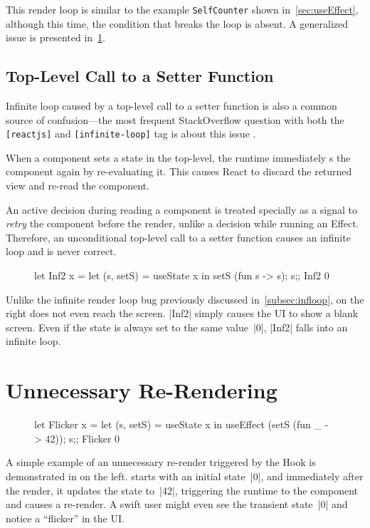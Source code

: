 This render loop is similar to the example \verb+SelfCounter+ shown in~\cref{sec:useEffect}, although this time, the condition that breaks the loop is absent.
A generalized issue is presented in~\cref{sec:unnec}.


\subsection{Top-Level Call to a Setter Function}\label{subsec:topset}
Infinite loop caused by a top-level call to a setter function is also a common source of confusion---the most frequent StackOverflow question with both the \texttt{[reactjs]} and \texttt{[infinite-loop]} tag is about this issue \citep{Teh19Updating}.

When a component sets a state in the top-level, the runtime immediately s the component again by re-evaluating it.
This causes React to discard the returned view and re-read the component.%

An active  decision during reading a component is treated specially as a signal to \emph{retry} the component before the render, unlike a  decision while running an Effect.
Therefore, an unconditional top-level call to a setter function causes an infinite loop and is never correct.

\begin{figure}
  \vspace{-0.9\intextsep}
  \begin{reactcode}
let Inf2 x =
  let (s, setS) = useState x in
  setS (fun s -> s);
  s;;
Inf2 0
  \end{reactcode}
\end{figure}
Unlike the infinite render loop bug previously discussed in~\cref{subsec:infloop},  on the right does not even reach the screen.
|Inf2| simply causes the UI to show a blank screen.
Even if the state is always set to the same value~|0|, |Inf2| falls into an infinite loop.



\section{Unnecessary Re-Rendering}\label{sec:unnec}
\begin{figure}
  \vspace*{-.5\intextsep}
  \begin{reactcode}
let Flicker x =
  let (s, setS) = useState x in
  useEffect (setS (fun _ -> 42));
  s;;
Flicker 0
  \end{reactcode}
\end{figure}
A simple example of an unnecessary re-render triggered by the  Hook is demonstrated in  on the left.
 starts with an initial state~|0|, and immediately after the render, it updates the state to~|42|, triggering the runtime to  the component and causes a re-render.
A swift user might even see the transient state~|0| and notice a ``flicker'' in the UI.

